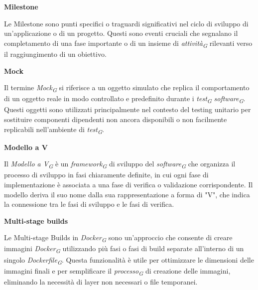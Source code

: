 \documentclass{article}
\begin{document}
\vspace{0.4cm}

\textbf{Milestone}

\vspace{0.1cm}

Le Milestone sono punti specifici o traguardi significativi nel ciclo di sviluppo di un'applicazione o di un progetto. Questi sono eventi cruciali che segnalano il completamento di una fase importante o di un insieme di \textit{attività}\textsubscript{\textit{G}} rilevanti verso il raggiungimento di un obiettivo.

\vspace{0.4cm}

\textbf{Mock}

\vspace{0.1cm}

Il termine \textit{Mock}\textsubscript{\textit{G}} si riferisce a un oggetto simulato che replica il comportamento di un oggetto reale in modo controllato e predefinito durante i \textit{test}\textsubscript{\textit{G}} \textit{software}\textsubscript{\textit{G}}. Questi oggetti sono utilizzati principalmente nel contesto del testing unitario per sostituire componenti dipendenti non ancora disponibili o non facilmente replicabili nell'ambiente di \textit{test}\textsubscript{\textit{G}}.

\vspace{0.4cm}

\textbf{Modello a V}

\vspace{0.1cm}

Il \textit{Modello a V}\textsubscript{\textit{G}} è un \textit{framework}\textsubscript{\textit{G}} di sviluppo del \textit{software}\textsubscript{\textit{G}} che organizza il processo di sviluppo in fasi chiaramente definite, in cui ogni fase di implementazione è associata a una fase di verifica o validazione corrispondente. Il modello deriva il suo nome dalla sua rappresentazione a forma di "V", che indica la connessione tra le fasi di sviluppo e le fasi di verifica. 

\vspace{0.4cm}

\textbf{Multi-stage builds}

\vspace{0.1cm}

Le Multi-stage Builds in \textit{Docker}\textsubscript{\textit{G}} sono un'approccio che consente di creare immagini \textit{Docker}\textsubscript{\textit{G}} utilizzando più fasi o fasi di build separate all'interno di un singolo \textit{Dockerfile}\textsubscript{\textit{G}}. Questa funzionalità è utile per ottimizzare le dimensioni delle immagini finali e per semplificare il \textit{processo}\textsubscript{\textit{G}} di creazione delle immagini, eliminando la necessità di layer non necessari o file temporanei.
\end{document}
